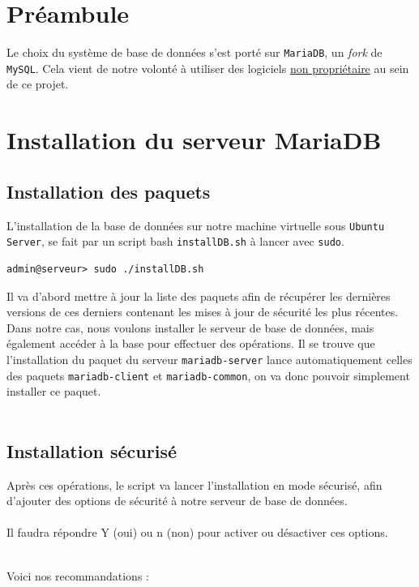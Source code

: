 \section{Préambule}
Le choix du système de base de données s'est porté sur \texttt{MariaDB}, un \textit{fork} de \texttt{MySQL}. Cela vient de notre volonté à utiliser des logiciels \href{https://mariadb.com/database-topics/mariadb-vs-mysql/}{non propriétaire} au sein de ce projet.


\section{Installation du serveur MariaDB}

\subsection{Installation des paquets}
L'installation de la base de données sur notre machine virtuelle sous \texttt{Ubuntu Server}, se fait par un script bash \texttt{installDB.sh} à lancer avec \texttt{sudo}.

\begin{verbatim}
admin@serveur> sudo ./installDB.sh
\end{verbatim}

Il va d'abord mettre à jour la liste des paquets afin de récupérer les dernières versions de ces derniers contenant les mises à jour de sécurité les plus récentes. Dans notre cas, nous voulons installer le serveur de base de données, mais également accéder à la base pour effectuer des opérations. Il se trouve que l'installation du paquet du serveur \texttt{mariadb-server} lance automatiquement celles des paquets \texttt{mariadb-client} et \texttt{mariadb-common}, on va donc pouvoir simplement installer ce paquet.\\\\ 

\subsection{Installation sécurisé}
Après ces opérations, le script va lancer l'installation en mode sécurisé, afin d'ajouter des options de sécurité à notre serveur de base de données.\\\\
Il faudra répondre \color{green}Y\color{black} (oui) ou \color{red}n \color{black}(non) pour activer ou désactiver ces options.\\\\
\begin{center}
    Voici nos recommandations :
\end{center}

